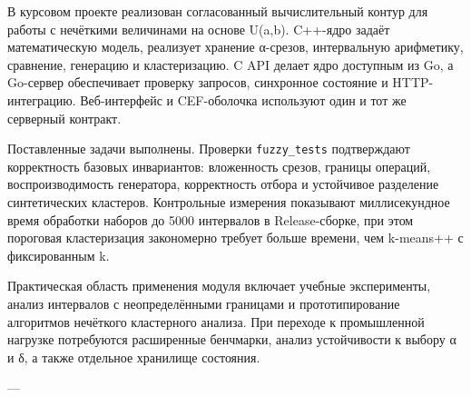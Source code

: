 В курсовом проекте реализован согласованный вычислительный контур для работы с нечёткими величинами на основе U(a,b). C++-ядро задаёт математическую модель, реализует хранение α-срезов, интервальную арифметику, сравнение, генерацию и кластеризацию. C API делает ядро доступным из Go, а Go-сервер обеспечивает проверку запросов, синхронное состояние и HTTP-интеграцию. Веб-интерфейс и CEF-оболочка используют один и тот же серверный контракт.

Поставленные задачи выполнены. Проверки \texttt{fuzzy\_tests} подтверждают корректность базовых инвариантов: вложенность срезов, границы операций, воспроизводимость генератора, корректность отбора и устойчивое разделение синтетических кластеров. Контрольные измерения показывают миллисекундное время обработки наборов до 5000 интервалов в Release-сборке, при этом пороговая кластеризация закономерно требует больше времени, чем k-means++ с фиксированным k.

Практическая область применения модуля включает учебные эксперименты, анализ интервалов с неопределёнными границами и прототипирование алгоритмов нечёткого кластерного анализа. При переходе к промышленной нагрузке потребуются расширенные бенчмарки, анализ устойчивости к выбору α и δ, а также отдельное хранилище состояния.

---